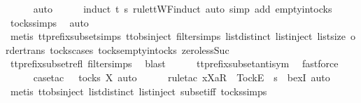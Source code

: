 \ \ \ \ \isamarkupfalse%
\ auto\isanewline
\ \ \ \ \isamarkupfalse%
\ {\isacharparenleft}induct\ t\ s\ rule{\isacharcolon}ttWF{}{\isachardot}induct{\isacharcomma}\ auto\ simp\ add{\isacharcolon}\ empty{\isacharunderscore}in{\isacharunderscore}tocks{\isacharparenright}\isanewline
\ \ \ \ \isamarkupfalse%
\ tocks{\isachardot}simps\ \isamarkupfalse%
\ auto\isanewline
\ \ \ \ \isamarkupfalse%
\ {\isacharparenleft}metis\ tt{\isacharunderscore}prefix{\isacharunderscore}subset{\isachardot}simps{\isacharparenleft}{}{\isacharparenright}\ ttobs{\isachardot}inject{\isacharparenleft}{}{\isacharparenright}\ filter{\isachardot}simps{\isacharparenleft}{}{\isacharparenright}\ list{\isachardot}distinct{\isacharparenleft}{}{\isacharparenright}\ list{\isachardot}inject\ list{\isachardot}size{\isacharparenleft}{}{\isacharparenright}\ order{\isacharunderscore}trans\ tocks{\isachardot}cases\ tocks{\isachardot}empty{\isacharunderscore}in{\isacharunderscore}tocks\ zero{\isacharunderscore}less{\isacharunderscore}Suc{\isacharparenright}\isanewline
\ \ \ \ \isamarkupfalse%
\ tt{\isacharunderscore}prefix{\isacharunderscore}subset{\isacharunderscore}refl\ filter{\isachardot}simps{\isacharparenleft}{}{\isacharparenright}\ \isamarkupfalse%
\ blast\isanewline
\ \ \ \ \isamarkupfalse%
\ tt{\isacharunderscore}prefix{\isacharunderscore}subset{\isacharunderscore}antisym\ \isamarkupfalse%
\ fastforce\isanewline
\ \ \ \ \isamarkupfalse%
\ {\isacharparenleft}case{\isacharunderscore}tac\ {\isachardoublequoteopen}{\isasymsigma}\ {\isasymin}\ tocks\ X{\isachardoublequoteclose}{\isacharcomma}\ auto{\isacharparenright}\isanewline
\ \ \ \ \isamarkupfalse%
\ {\isacharparenleft}rule{\isacharunderscore}tac\ x{\isacharequal}{\isachardoublequoteopen}{\isacharbrackleft}Xa{\isacharbrackright}\isactrlsub R\ {\isacharhash}\ {\isacharbrackleft}Tock{\isacharbrackright}\isactrlsub E\ {\isacharhash}\ s{\isacharprime}{\isachardoublequoteclose}\ \ bexI{\isacharcomma}\ auto{\isacharparenright}\isanewline
\ \ \ \ \isamarkupfalse%
\ {\isacharparenleft}metis\ ttobs{\isachardot}inject{\isacharparenleft}{}{\isacharparenright}\ list{\isachardot}distinct{\isacharparenleft}{}{\isacharparenright}\ list{\isachardot}inject\ subset{\isacharunderscore}iff\ tocks{\isachardot}simps{\isacharparenright}\isanewline
